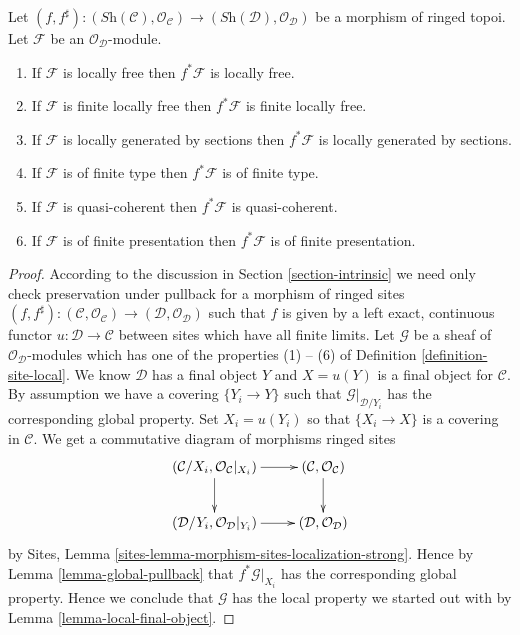 \begin{lemma}
\label{lemma-local-pullback}
Let
$(f, f^\sharp) :
(\textit{Sh}(\mathcal{C}), \mathcal{O}_{\mathcal{C}})
\to
(\textit{Sh}(\mathcal{D}), \mathcal{O}_{\mathcal{D}})$
be a morphism of ringed topoi.
Let $\mathcal{F}$ be an $\mathcal{O}_{\mathcal{D}}$-module.
\begin{enumerate}
\item If $\mathcal{F}$ is locally free then $f^*\mathcal{F}$ is locally free.
\item If $\mathcal{F}$ is finite locally free then $f^*\mathcal{F}$ is
finite locally free.
\item If $\mathcal{F}$ is locally generated by sections
then $f^*\mathcal{F}$ is locally generated by sections.
\item If $\mathcal{F}$ is of finite type
then $f^*\mathcal{F}$ is of finite type.
\item If $\mathcal{F}$ is quasi-coherent then
$f^*\mathcal{F}$ is quasi-coherent.
\item If $\mathcal{F}$ is of finite presentation
then $f^*\mathcal{F}$ is of finite presentation.
\end{enumerate}
\end{lemma}

\begin{proof}
According to the discussion in Section \ref{section-intrinsic}
we need only check preservation under pullback for a morphism of ringed sites
$(f, f^\sharp) :
(\mathcal{C}, \mathcal{O}_{\mathcal{C}})
\to
(\mathcal{D}, \mathcal{O}_{\mathcal{D}})$
such that $f$ is given by a left exact, continuous functor
$u : \mathcal{D} \to \mathcal{C}$ between sites which have 
all finite limits.
Let $\mathcal{G}$ be a sheaf of $\mathcal{O}_{\mathcal{D}}$-modules
which has one of the properties (1) -- (6) of
Definition \ref{definition-site-local}.
We know $\mathcal{D}$ has a final object $Y$ and $X = u(Y)$
is a final object for $\mathcal{C}$. By assumption we have
a covering $\{Y_i \to Y\}$ such that $\mathcal{G}|_{\mathcal{D}/Y_i}$
has the corresponding global property. Set $X_i = u(Y_i)$ so
that $\{X_i \to X\}$ is a covering in $\mathcal{C}$.
We get a commutative diagram of morphisms ringed sites
$$
\xymatrix{
(\mathcal{C}/X_i, \mathcal{O}_{\mathcal{C}}|_{X_i}) \ar[r] \ar[d] &
(\mathcal{C}, \mathcal{O}_{\mathcal{C}}) \ar[d] \\
(\mathcal{D}/Y_i, \mathcal{O}_{\mathcal{D}}|_{Y_i}) \ar[r] &
(\mathcal{D}, \mathcal{O}_{\mathcal{D}})
}
$$
by Sites, Lemma \ref{sites-lemma-morphism-sites-localization-strong}.
Hence by Lemma \ref{lemma-global-pullback}
that $f^*\mathcal{G}|_{X_i}$ has the corresponding global
property. Hence we conclude that $\mathcal{G}$ has the local
property we started out with by Lemma \ref{lemma-local-final-object}.
\end{proof}







